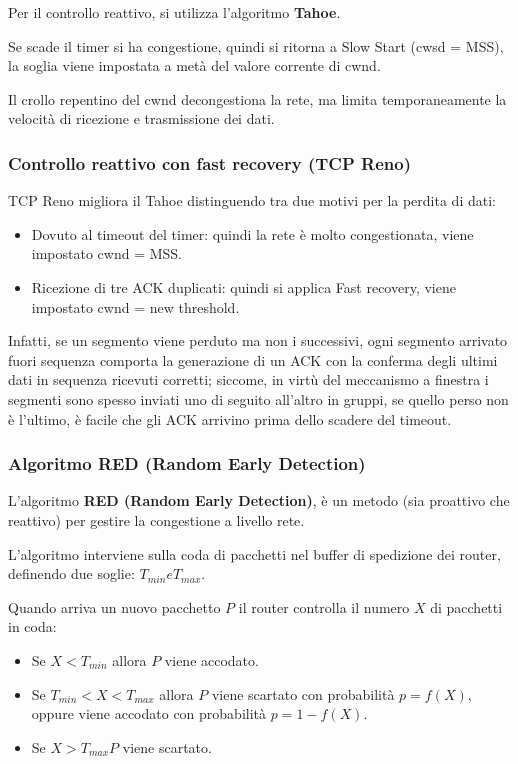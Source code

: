             Per il controllo reattivo, si utilizza l'algoritmo \textbf{Tahoe}.
    
            Se scade il timer si ha congestione, quindi si ritorna a Slow Start (cwsd = MSS), la soglia viene impostata a metà del valore corrente di cwnd.
    
            Il crollo repentino del cwnd decongestiona la rete, ma limita temporaneamente la velocità di ricezione e trasmissione dei dati.

        \subsubsection{Controllo reattivo con fast recovery (TCP Reno)}
            TCP Reno migliora il Tahoe distinguendo tra due motivi per la perdita di dati:
            \begin{itemize}
                \item Dovuto al timeout del timer: quindi la rete è molto congestionata, viene impostato cwnd = MSS.
                \item Ricezione di tre ACK duplicati: quindi si applica Fast recovery, viene impostato cwnd = new threshold.
            \end{itemize}

            Infatti, se un segmento viene perduto ma non i successivi, ogni segmento arrivato fuori sequenza comporta la generazione di un ACK con la conferma degli ultimi dati in sequenza ricevuti corretti; siccome, in virtù del meccanismo a finestra i segmenti sono spesso inviati uno di seguito all'altro in gruppi, se quello perso non è l'ultimo, è facile che gli ACK arrivino prima dello scadere del timeout.

        \subsubsection{Algoritmo RED (Random Early Detection)}
            L'algoritmo \textbf{RED (Random Early Detection)}, è un metodo (sia proattivo che reattivo) per gestire la congestione a livello rete.
        
            L'algoritmo interviene sulla coda di pacchetti nel buffer di spedizione dei router, definendo due soglie: $T_{min} e T_{max}$.
        
            Quando arriva un nuovo pacchetto $P$ il router controlla il numero $X$ di pacchetti in coda:
            \begin{itemize}
                \item Se $X < T_{min}$ allora $P$ viene accodato.
                \item Se $T_{min} < X < T_{max}$ allora $P$ viene scartato con probabilità $p = f(X)$,
                oppure viene accodato con probabilità $p = 1 - f(X)$.
                \item Se $X > T_{max} P$ viene scartato.
            \end{itemize}

